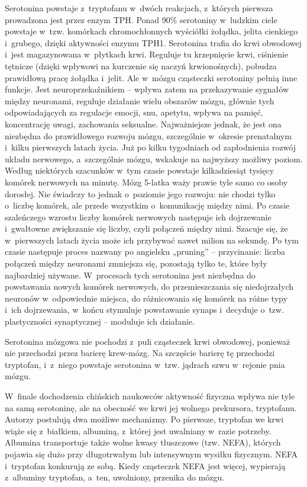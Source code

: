 \begin{dwieszpalty}
Serotonina powstaje z~tryptofanu w~dwóch reakcjach, z~których pierwsza prowadzona jest przez  enzym TPH. Ponad 90\% serotoniny w~ludzkim ciele powstaje w~tzw. komórkach chromochłonnych wyściółki żołądka, jelita cienkiego i~grubego, dzięki aktywności enzymu TPH1. Serotonina trafia do krwi obwodowej i~jest magazynowana w~płytkach krwi. Reguluje tu krzepnięcie krwi,  ciśnienie tętnicze (dzięki wpływowi na kurczenie się naczyń krwionośnych), pobudza prawidłową pracę żołądka i~jelit. Ale w~mózgu cząsteczki serotoniny pełnią inne funkcje. Jest neuroprzekaźnikiem – wpływa zatem na przekazywanie sygnałów między neuronami, reguluje działanie wielu obszarów mózgu, głównie tych odpowiadających za regulacje emocji, snu, apetytu, wpływa na pamięć, koncentrację uwagi, zachowania seksualne. Najważniejsze jednak, że jest ona niezbędna do prawidłowego rozwoju mózgu, szczególnie w~okresie prenatalnym i~kilku pierwszych latach życia. Już po kilku tygodniach od zapłodnienia rozwój układu nerwowego, a~szczególnie mózgu, wskakuje na najwyższy możliwy poziom. Według niektórych szacunków w~tym czasie powstaje kilkadziesiąt tysięcy komórek nerwowych na minutę. Mózg 5-latka waży prawie tyle samo co osoby dorosłej. Nie świadczy to jednak o~poziomie jego rozwoju: nie chodzi tylko o~liczbę komórek, ale przede wszystkim o~komunikację między nimi. Po czasie szaleńczego wzrostu liczby komórek nerwowych  następuje ich dojrzewanie i~gwałtowne zwiększanie się liczby, czyli połączeń między nimi. Szacuje się, że w~pierwszych latach życia może ich przybywać nawet milion na sekundę. Po tym czasie następuje proces nazwany po angielsku „pruning” –  przycinanie: liczba połączeń między neuronami zmniejsza się, pozostają tylko te, które były najbardziej używane. W~procesach tych serotonina jest niezbędna do powstawania nowych komórek nerwowych, do przemieszczania się niedojrzałych neuronów w~odpowiednie miejsca, do różnicowania się komórek na różne typy i~ich dojrzewania,  w~końcu stymuluje powstawanie synaps i~decyduje o~tzw. plastyczności synaptycznej – moduluje ich działanie.

Serotonina mózgowa nie pochodzi z~puli cząsteczek krwi obwodowej, ponieważ nie przechodzi przez barierę krew-mózg.  Na szczęście barierę tę przechodzi tryptofan, i~z~niego powstaje serotonina w~tzw. jądrach szwu w~rejonie pnia mózgu.
\end{dwieszpalty}

W~finale dochodzenia chińskich naukowców aktywność fizyczna wpływa nie tyle na samą serotoninę, ale na  obecność we krwi jej wolnego prekursora, tryptofanu.  Autorzy postulują dwa możliwe mechanizmy. Po pierwsze, tryptofan we krwi wiąże się z~białkiem, albuminą, z~której jest uwalniany w~razie potrzeby. Albumina transportuje także wolne kwasy tłuszczowe (tzw. NEFA), których pojawia się dużo przy długotrwałym lub intensywnym wysiłku fizycznym. NEFA i~tryptofan konkurują ze sobą. Kiedy cząsteczek NEFA jest więcej, wypierają z~albuminy tryptofan, a~ten, uwolniony, przenika do mózgu.

